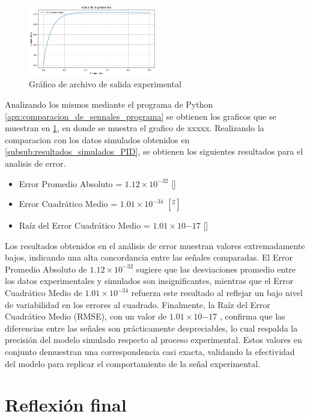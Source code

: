 \begin{figure}[h!]
    \centering
    \includegraphics[width=0.5\textwidth]{fig/Capitulo5/Caso_de_estudio_PID/datos/experimental.png}
    \caption{Gráfico de archivo de salida experimental}
    \label{fig:experimentales_PID}
\end{figure}

Analizando los mismos mediante el programa de Python \ref{apx:comparacion_de_sennales_programa} se obtienen los graficos que se muestran en \ref{fig:experimentales_PID}, en donde se muestra el grafico de xxxxx. Realizando la comparacion con los datos simulados obtenidos en \ref{subsub:resultados_simulados_PID}, se obtienen los siguientes resultados para el analisis de error.

\begin{itemize}
    \item Error Promedio Absoluto = $1.12\times 10^{-32}$ []
    \item Error Cuadrático Medio = $1.01 \times 10^{-34}$ $[^{2}]$
    \item Raíz del Error Cuadrático Medio = $1.01 \times 10{-17}$ []
\end{itemize}


Los resultados obtenidos en el análisis de error muestran valores extremadamente bajos, indicando una alta concordancia entre las señales comparadas. El Error Promedio Absoluto de $1.12\times 10^{-32}$ sugiere que las desviaciones promedio entre los datos experimentales y simulados son insignificantes, mientras que el Error Cuadrático Medio de 
 $1.01 \times 10^{-34}$  refuerza este resultado al reflejar un bajo nivel de variabilidad en los errores al cuadrado. Finalmente, la Raíz del Error Cuadrático Medio (RMSE), con un valor de $1.01 \times 10{-17}$ , confirma que las diferencias entre las señales son prácticamente despreciables, lo cual respalda la precisión del modelo simulado respecto al proceso experimental. Estos valores en conjunto demuestran una correspondencia casi exacta, validando la efectividad del modelo para replicar el comportamiento de la señal experimental.

\section{Reflexión final}


